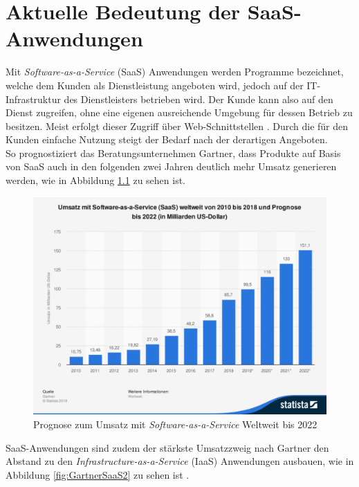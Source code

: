 
\chapter{Aktuelle Bedeutung der SaaS-Anwendungen}

Mit \textit{Software-as-a-Service} (SaaS) Anwendungen werden Programme bezeichnet, welche dem Kunden als Dienstleistung angeboten wird, jedoch auf der IT-Infrastruktur des Dienstleisters betrieben wird. Der Kunde kann also auf den Dienst zugreifen, ohne eine eigenen ausreichende Umgebung für dessen Betrieb zu besitzen. Meist erfolgt dieser Zugriff über Web-Schnittstellen \cite{McNee2007}. Durch die für den Kunden einfache Nutzung steigt der Bedarf nach der derartigen Angeboten.\\

So prognostiziert das Beratungsunternehmen Gartner, dass Produkte auf Basis von SaaS auch in den folgenden zwei Jahren deutlich mehr Umsatz generieren werden, wie in Abbildung \ref{fig:GartnerSaaS} zu sehen ist. \\

\begin{figure}[h]
	\centering
	\includegraphics[width=1\textwidth]{Bilder/einleitung/SaaSUmsatzentwicklung}
	\caption{Prognose zum Umsatz mit \textit{Software-as-a-Service} Weltweit bis 2022 \cite{Gartner2020}}
	\label{fig:GartnerSaaS}
\end{figure}

SaaS-Anwendungen sind zudem der stärkste Umsatzzweig nach Gartner den Abstand zu den \textit{Infrastructure-as-a-Service} (IaaS) Anwendungen ausbauen, wie in Abbildung \ref{fig:GartnerSaaS2} zu sehen ist \cite{Gartner2019}.\\

